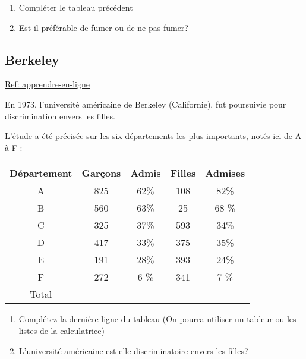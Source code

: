 \documentclass[10pt,dvipsnames, dvips, svgnames]{article}
\begin{document}
\begin{enumerate}
	\item Compléter le tableau précédent
	\item Est il préférable de fumer ou de ne pas fumer?



\end{enumerate}




\subsection{Berkeley}

\href{https://www.apprendre-en-ligne.net/MADIMU2/STATI/STATI1.PDF}{Ref: apprendre-en-ligne}



En 1973, l'université américaine de Berkeley (Californie), fut poursuivie pour discrimination envers les filles.






L'étude a été précisée sur les six départements les plus importants, notés ici de A à F : 

\begin{center}
\begin{tabular}[]{|c |c |c |c |c |}
\hline Département & Garçons & Admis & Filles & Admises \\
\hline A & 825 & 62\% & 108 & 82\% \\
\hline B & 560 & 63\% & 25  & 68 \% \\
\hline C & 325 & 37\% & 593 & 34\% \\
\hline D & 417 & 33\% & 375 & 35\% \\
\hline E & 191 & 28\% & 393 & 24\% \\
\hline F & 272 & 6 \% & 341 & 7 \% \\
\hline Total &  &  &  &  \\
\hline  
\end{tabular} 
\end{center}

\begin{enumerate}
	\item Complétez la dernière ligne du tableau (On pourra  utiliser un tableur ou les listes de la calculatrice)
	\item L'université américaine est elle discriminatoire envers les filles?
\end{enumerate}
\end{document}

